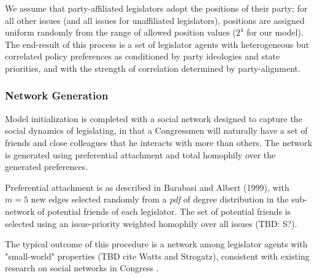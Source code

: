 \documentclass[pdftex,12pt]{llncs}
\begin{document}
We assume that party-affiliated legislators adopt the positions of their party; for all other issues (and all issues for unaffiliated legislators), positions are assigned uniform randomly from the range of allowed position values ($2^4$ for our model).
The end-result of this process is a set of legislator agents with heterogeneous but correlated policy preferences as conditioned by party ideologies and state priorities, and with the strength of correlation determined by party-alignment.
\subsubsection{Network Generation}
Model initialization is completed with a social network designed to capture the social dynamics of legislating, in that a Congressmen will naturally have a set of friends and close colleagues that he interacts with more than others.
The network is generated using preferential attachment and total homophily over the generated preferences.

Preferential attachment is as described in Barabasi and Albert (1999), with $m=5$ new edges selected randomly from a \textit{pdf} of degree distribution in the sub-network of potential friends of each legislator.
The set of potential friends is selected using an issue-priority weighted homophily over all issues (TBD: S?).

The typical outcome of this procedure is a network among legislator agents with "small-world" properties (TBD cite Watts and Strogatz), consistent with existing research on social networks in Congress \parencite{Granovetter1978}.
\end{document}
